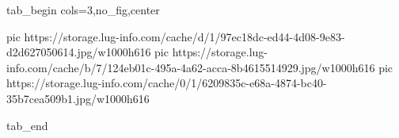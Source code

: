  
 
 
 
 


\ifcmt
  tab_begin cols=3,no_fig,center

     pic https://storage.lug-info.com/cache/d/1/97ec18dc-ed44-4d08-9e83-d2d627050614.jpg/w1000h616
		 pic https://storage.lug-info.com/cache/b/7/124eb01c-495a-4a62-acca-8b4615514929.jpg/w1000h616
		 pic https://storage.lug-info.com/cache/0/1/6209835c-e68a-4874-bc40-35b7cea509b1.jpg/w1000h616

  tab_end
\fi
